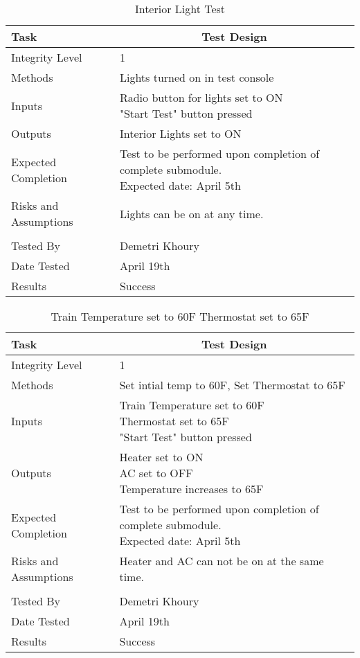 \documentclass[]{article}
\begin{document}
	\begin{table}[H]
		\centering
		\caption{Interior Light Test}
		\begin{tabular}{|l|l|}
			\hline
			Task & \multicolumn{1}{c|}{Test Design} \\ \hline
			Integrity Level & 1 \\ \hline
			Methods & Lights turned on in test console  \\ \hline
			Inputs &  \parbox[t]{10cm}{Radio button for lights set to ON\\ "Start Test" button pressed }\\ \hline
			Outputs &Interior Lights set to ON \\ \hline
			Expected Completion & \parbox[t]{10cm}{Test to be performed upon completion of complete submodule.\\ Expected date: April 5th}\\ \hline
			Risks and Assumptions & Lights can be on at any time.\\ \hline
			\\ \hline
			Tested By   &  Demetri Khoury\\	\hline
			Date Tested & \parbox[t]{10cm}{April 19th}\\ \hline
			Results & Success\\ \hline
		\end{tabular}
	\end{table}

	\begin{table}[H]
		\centering
		\caption{Train Temperature set to 60F Thermostat set to 65F}
		\begin{tabular}{|l|l|}
			\hline
			Task & \multicolumn{1}{c|}{Test Design} \\ \hline
			Integrity Level & 1 \\ \hline
			Methods & Set intial temp to 60F, Set Thermostat to 65F  \\ \hline
			Inputs &  \parbox[t]{10cm}{Train Temperature set to 60F\\ Thermostat set to 65F\\ "Start Test" button pressed }\\ \hline
			Outputs &\parbox[t]{10cm}{ Heater set to ON\\AC set to OFF\\ Temperature increases to 65F} \\ \hline
			Expected Completion & \parbox[t]{10cm}{Test to be performed upon completion of complete submodule.\\ Expected date: April 5th}\\ \hline
			Risks and Assumptions & Heater and AC can not be on at the same time.\\ \hline
			\\ \hline
			Tested By   &  Demetri Khoury\\	\hline
			Date Tested & \parbox[t]{10cm}{April 19th}\\ \hline
			Results & Success\\ \hline
		\end{tabular}
	\end{table}
\end{document}

